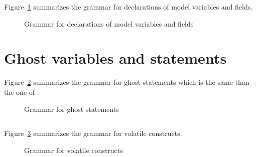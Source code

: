 \nodiff

Figure~\ref{fig:gram:model} summarizes the grammar for declarations of model
variables and fields.
\begin{figure}[htbp]
  \caption{Grammar for declarations of model variables and fields}
\label{fig:gram:model}
\end{figure}


\section{Ghost variables and statements}
\label{sec:ghost}

\nodiff

Figure~\ref{fig:gram:ghost} summarizes the grammar for ghost statements which is
the same than the one of \acsl.
\begin{figure}[htbp]
  \caption{Grammar for ghost statements}
\label{fig:gram:ghost}
\end{figure}


\subsection{}
\label{sec:volatile-variables}

Figure~\ref{fig:gram:volatile} summarizes the grammar for volatile constructs.
\begin{figure}[htp]
  \begin{cadre}
      
    \end{cadre}
  \caption{Grammar for volatile constructs}
\label{fig:gram:volatile}
\end{figure}


